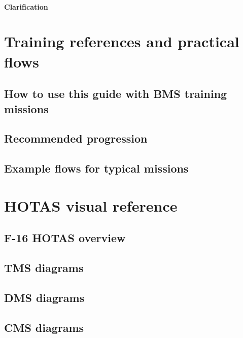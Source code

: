 \documentclass[11pt, a4paper, twoside]{report}
\begin{document}
\subsubsection{Clarification}
\label{sec:C5-S3-S1-S3}

\chapter{Training references and practical flows}
\label{chap:C6}

\section{How to use this guide with BMS training missions}
\label{sec:C6-S1}

\section{Recommended progression}
\label{sec:C6-S2}

\section{Example flows for typical missions}
\label{sec:C6-S3}

\chapter{HOTAS visual reference}
\label{chap:C7}

\section{F-16 HOTAS overview}
\label{sec:C7-S1}

\section{TMS diagrams}
\label{sec:C7-S2}

\section{DMS diagrams}
\label{sec:C7-S3}

\section{CMS diagrams}
\label{sec:C7-S4}

\appendix
\end{document}
